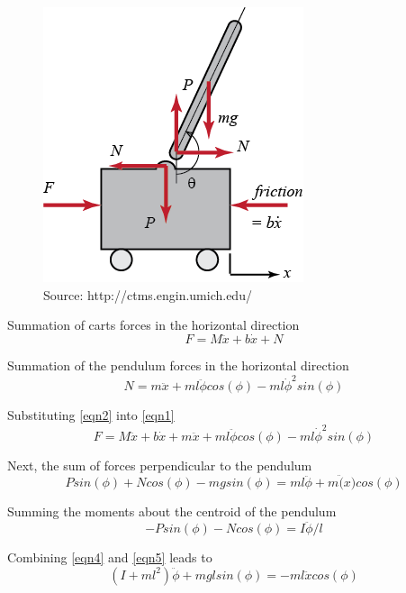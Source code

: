 \documentclass{article}
\begin{document}
\begin{figure}[!htb]
\centering
\includegraphics{pendulumfbd}
\caption{Source: http://ctms.engin.umich.edu/}
\end{figure}

Summation of carts forces in the horizontal direction
\begin{equation} 
\label{eqn1}
F = M\ddot{x}+b\dot{x} + N
\end{equation}

Summation of the pendulum forces in the horizontal direction
\begin{equation} 
\label{eqn2}
N = m\ddot{x}+m l \ddot{\phi} cos(\phi)-m l \dot{\phi}^2sin(\phi)
\end{equation}

Substituting \ref{eqn2} into \ref{eqn1}
\begin{equation} 
\label{eqn3}
F = M\ddot{x}+b\dot{x} + m\ddot{x}+m l \ddot{\phi} cos(\phi)-m l \dot{\phi}^2sin(\phi)
\end{equation}

Next, the sum of forces perpendicular to the pendulum
\begin{equation} 
\label{eqn4}
Psin(\phi)+Ncos(\phi)-mgsin(\phi) = m l \ddot{\phi} + m\ddot(x)cos(\phi)
\end{equation}

Summing the moments about the centroid of the pendulum
\begin{equation} 
\label{eqn5}
-P sin(\phi)-N cos(\phi) = I \ddot{\phi}/l
\end{equation}

Combining \ref{eqn4} and \ref{eqn5} leads to 
\begin{equation} 
\label{eqn6}
(I+m l^2)\ddot{\phi} + m g lsin(\phi) = -m l \ddot{x} cos(\phi)
\end{equation}
\end{document}
